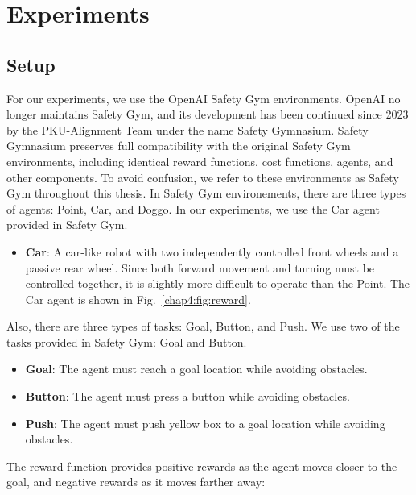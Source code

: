 
\chapter{Experiments}\label{chapter4}

\section{Setup} \label{chap4:sec:setup}

For our experiments, we use the OpenAI Safety Gym \cite{PPO-Lagrangian, Safety-Gymnasium} environments.
OpenAI no longer maintains Safety Gym, and its development has been continued since 2023 by the PKU-Alignment Team under the name Safety Gymnasium.
Safety Gymnasium preserves full compatibility with the original Safety Gym environments, including identical reward functions, cost functions, agents, and other components.
To avoid confusion, we refer to these environments as Safety Gym throughout this thesis.
In Safety Gym environements, there are three types of agents: Point, Car, and Doggo.
In our experiments, we use the Car agent provided in Safety Gym.
\begin{itemize}
    \item \textbf{Car}: A car-like robot with two independently controlled front wheels and a passive rear wheel. Since both forward movement and turning must be controlled together, it is slightly more difficult to operate than the Point. The Car agent is shown in Fig.~\ref{chap4:fig:reward}.
\end{itemize}
Also, there are three types of tasks: Goal, Button, and Push.
We use two of the tasks provided in Safety Gym: Goal and Button.
\begin{itemize}
    \item \textbf{Goal}: The agent must reach a goal location while avoiding obstacles.
    \item \textbf{Button}: The agent must press a button while avoiding obstacles.
    \item \textbf{Push}: The agent must push yellow box to a goal location while avoiding obstacles.
\end{itemize}
The reward function provides positive rewards as the agent moves closer to the goal, and negative rewards as it moves farther away:
